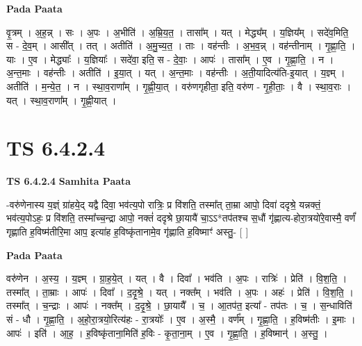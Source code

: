 \documentclass[17pt]{extarticle}
\begin{document}
\textbf{Pada Paata} \newline

वृ॒त्रम् । अ॒ह॒न्न् । सः । अ॒पः । अ॒भीति॑ । अ॒म्रि॒य॒त॒ । तासा᳚म् । यत् । मेद्ध्य᳚म् । य॒ज्ञिय᳚म् । सदे॑व॒मिति॒ स - दे॒व॒म् । आसी᳚त् । तत् । अतीति॑ । अ॒मु॒च्य॒त॒ । ताः । वह॑न्तीः । अ॒भ॒व॒न्न् । वह॑न्तीनाम् । गृ॒ह्णा॒ति॒ । याः । ए॒व । मेद्ध्याः᳚ । य॒ज्ञियाः᳚ । सदे॑वा॒ इति॒ स - दे॒वाः॒ । आपः॑ । तासा᳚म् । ए॒व । गृ॒ह्णा॒ति॒ । न । अ॒न्त॒माः । वह॑न्तीः । अतीति॑ । इ॒या॒त् । यत् । अ॒न्त॒माः । वह॑न्तीः । अ॒ती॒यादित्य॑ति-इ॒यात् । य॒ज्ञ्म् । अतीति॑ । म॒न्ये॒त॒ । न । स्था॒व॒राणा᳚म् । गृ॒ह्णी॒या॒त् । वरु॑णगृहीता॒ इति॒ वरु॑ण - गृ॒ही॒ताः॒ । वै । स्था॒व॒राः । यत् । स्था॒व॒राणा᳚म् । गृ॒ह्णी॒यात् ।  \newline




\section*{ TS 6.4.2.4 }

\textbf{TS 6.4.2.4 } \newline
\textbf{Samhita Paata} \newline

-वरु॑णेनास्य य॒ज्ञ्ं ग्रा॑हये॒द् यद्वै दिवा॒ भव॑त्य॒पो रात्रिः॒ प्र वि॑शति॒ तस्मा᳚त् ता॒म्रा आपो॒ दिवा॑ ददृश्रे॒ यन्नक्तं॒ भव॑त्य॒पोऽहः॒ प्र वि॑शति॒ तस्मा᳚च्च॒न्द्रा आपो॒ नक्तं॑ ददृश्रे छा॒यायै॑ चा॒ऽऽ*तप॑तश्च स॒धौं गृ॑ह्णात्य-होरा॒त्रयो॑रे॒वास्मै॒ वर्णं॑ गृह्णाति ह॒विष्म॑तीरि॒मा आप॒ इत्या॑ह ह॒विष्कृ॑तानामे॒व गृ॑ह्णाति ह॒विष्माꣳ॑ अस्तु॒- [  ] \newline

\textbf{Pada Paata} \newline

वरु॑णेन । अ॒स्य॒ । य॒ज्ञ्म् । ग्रा॒ह॒ये॒त् । यत् । वै । दिवा᳚ । भव॑ति । अ॒पः । रात्रिः॑ । प्रेति॑ । वि॒श॒ति॒ । तस्मा᳚त् । ता॒म्राः । आपः॑ । दिवा᳚ । द॒दृ॒श्रे॒ । यत् । नक्त᳚म् । भव॑ति । अ॒पः । अहः॑ । प्रेति॑ । वि॒श॒ति॒ । तस्मा᳚त् । च॒न्द्राः । आपः॑ । नक्त᳚म् । द॒दृ॒श्रे॒ । छा॒यायै᳚ । च॒ । आ॒तप॑त॒ इत्या᳚ - तप॑तः । च॒ । स॒न्धाविति॑ सं - धौ । गृ॒ह्णा॒ति॒ । अ॒हो॒रा॒त्रयो॒रित्य॑हः - रा॒त्रयोः᳚ । ए॒व । अ॒स्मै॒ । वर्ण᳚म् । गृ॒ह्णा॒ति॒ । ह॒विष्म॑तीः । इ॒माः । आपः॑ । इति॑ । आ॒ह॒ । ह॒विष्कृ॑ताना॒मिति॑ ह॒विः - कृ॒ता॒ना॒म् । ए॒व । गृ॒ह्णा॒ति॒ । ह॒विष्मान्॑ । अ॒स्तु॒ ।  \newline




\end{document}
